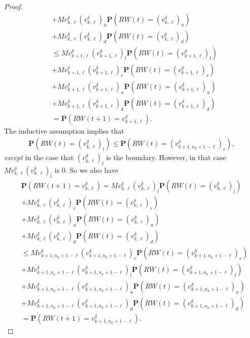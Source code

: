 \documentclass[]{amsart}
\numberwithin{equation}{section}
\begin{document}
\begin{proof}
\begin{align}
& + Mv^{\delta}_{k,\ell}(v^{\delta}_{k,\ell})_u \mathbf{P}(RW(t) = (v^{\delta}_{k,\ell})_u) \\
&+ Mv^{\delta}_{k,\ell}(v^{\delta}_{k,\ell})_d \mathbf{P}(RW(t) = (v^{\delta}_{k,\ell})_d)\\
&\le Mv^{\delta}_{k+1,\ell}(v^{\delta}_{k+1,\ell})_l \mathbf{P}(RW(t) = (v^{\delta}_{k+1,\ell})_l) \\
&+ Mv^{\delta}_{k+1,\ell}(v^{\delta}_{k+1,\ell})_r \mathbf{P}(RW(t) = (v^{\delta}_{k+1,\ell})_r)\\
& + Mv^{\delta}_{k+1,\ell}(v^{\delta}_{k+1,\ell})_u \mathbf{P}(RW(t) = (v^{\delta}_{k+1,\ell})_u) \\
&+ Mv^{\delta}_{k+1,\ell}(v^{\delta}_{k+1,\ell})_d \mathbf{P}(RW(t) = (v^{\delta}_{k+1,\ell})_d)\\
&= \mathbf{P}(RW(t+1) = v^{\delta}_{k+1,\ell}).
\end{align}
The inductive assumption implies that 
\begin{align}
\mathbf{P}(RW(t) = (v^{\delta}_{k,\ell})_l) \le \mathbf{P}(RW(t) = (v^{\delta}_{k+1,n_k+1-\ell})_r),
\end{align}
\textit{except} in the case that $(v^{\delta}_{k,\ell})_l$ is the boundary.  However, in that case $Mv^{\delta}_{k,\ell}(v^{\delta}_{k,\ell})_l$ is 0.  
So we also have
\begin{align}
&\mathbf{P}(RW(t+1) = v^{\delta}_{k,\ell}) = Mv^{\delta}_{k,\ell}(v^{\delta}_{k,\ell})_l \mathbf{P}(RW(t) = (v^{\delta}_{k,\ell})_l) \\
&+ Mv^{\delta}_{k,\ell}(v^{\delta}_{k,\ell})_r \mathbf{P}(RW(t) = (v^{\delta}_{k,\ell})_r)\\
& + Mv^{\delta}_{k,\ell}(v^{\delta}_{k,\ell})_u \mathbf{P}(RW(t) = (v^{\delta}_{k,\ell})_u) \\
&+ Mv^{\delta}_{k,\ell}(v^{\delta}_{k,\ell})_d \mathbf{P}(RW(t) = (v^{\delta}_{k,\ell})_d)\\
&\le Mv^{\delta}_{k+1,n_k+1-\ell}(v^{\delta}_{k+1,n_k+1-\ell})_r \mathbf{P}(RW(t) = (v^{\delta}_{k+1,n_k+1-\ell})_r) \\
&+ Mv^{\delta}_{k+1,n_k+1-\ell}(v^{\delta}_{k+1,n_k+1-\ell})_l \mathbf{P}(RW(t) = (v^{\delta}_{k+1,n_k+1-\ell})_l) \\
& + Mv^{\delta}_{k+1,n_k+1-\ell}(v^{\delta}_{k+1,n_k+1-\ell})_u \mathbf{P}(RW(t) = (v^{\delta}_{k+1,n_k+1-\ell})_u) \\
&+ Mv^{\delta}_{k+1,n_k+1-\ell}(v^{\delta}_{k+1,n_k+1-\ell})_d \mathbf{P}(RW(t) = (v^{\delta}_{k+1,n_k+1-\ell})_d)\\
&= \mathbf{P}(RW(t+1) = v^{\delta}_{k+1,n_k+1-\ell}).
\end{align}
\end{proof}
\end{document}
